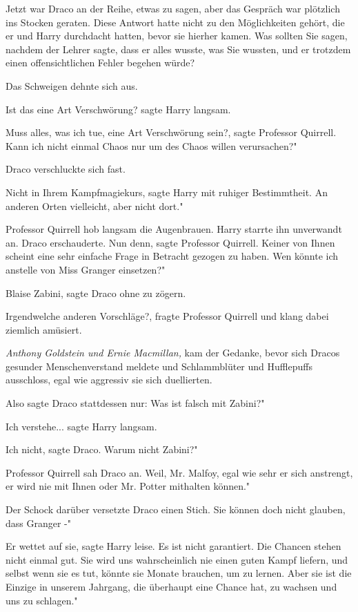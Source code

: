 Jetzt war Draco an der Reihe, etwas zu sagen, aber das Gespräch war plötzlich
ins Stocken geraten. Diese Antwort hatte nicht zu den Möglichkeiten gehört, die
er und Harry durchdacht hatten, bevor sie hierher kamen. Was sollten Sie sagen,
nachdem der Lehrer sagte, dass er alles wusste, was Sie wussten, und er trotzdem
einen offensichtlichen Fehler begehen würde?

Das Schweigen dehnte sich aus.

\glqq Ist das eine Art Verschwörung?\grqq{} sagte Harry langsam.

\glqq Muss alles, was ich tue, eine Art Verschwörung sein?\grqq{}, sagte
Professor Quirrell. \glqq Kann ich nicht einmal Chaos nur um des Chaos willen
verursachen?"

Draco verschluckte sich fast.

\glqq Nicht in Ihrem Kampfmagiekurs\grqq{}, sagte Harry mit ruhiger
Bestimmtheit. \glqq An anderen Orten vielleicht, aber nicht dort."

Professor Quirrell hob langsam die Augenbrauen. Harry starrte ihn unverwandt an.
Draco erschauderte. \glqq Nun denn\grqq{}, sagte Professor Quirrell. \glqq
Keiner von Ihnen scheint eine sehr einfache Frage in Betracht gezogen zu haben.
Wen könnte ich anstelle von Miss Granger einsetzen?"

\glqq Blaise Zabini\grqq{}, sagte Draco ohne zu zögern.

\glqq Irgendwelche anderen Vorschläge?\grqq{}, fragte Professor Quirrell und
klang dabei ziemlich amüsiert.

\emph{Anthony Goldstein und Ernie Macmillan,} kam der Gedanke, bevor sich Dracos
gesunder Menschenverstand meldete und Schlammblüter und Hufflepuffs ausschloss,
egal wie aggressiv sie sich duellierten.

Also sagte Draco stattdessen nur: \glqq Was ist falsch mit Zabini?"

\glqq Ich verstehe...\grqq{} sagte Harry langsam.

\glqq Ich nicht\grqq{}, sagte Draco. \glqq Warum nicht Zabini?"

Professor Quirrell sah Draco an. \glqq Weil, Mr. Malfoy, egal wie sehr er sich
anstrengt, er wird nie mit Ihnen oder Mr. Potter mithalten können."

Der Schock darüber versetzte Draco einen Stich. \glqq Sie können doch nicht
glauben, dass Granger -"

\glqq Er wettet auf sie\grqq{}, sagte Harry leise. \glqq Es ist nicht
garantiert. Die Chancen stehen nicht einmal gut. Sie wird uns wahrscheinlich nie
einen guten Kampf liefern, und selbst wenn sie es tut, könnte sie Monate
brauchen, um zu lernen. Aber sie ist die Einzige in unserem Jahrgang, die
überhaupt eine Chance hat, zu wachsen und uns zu schlagen."

